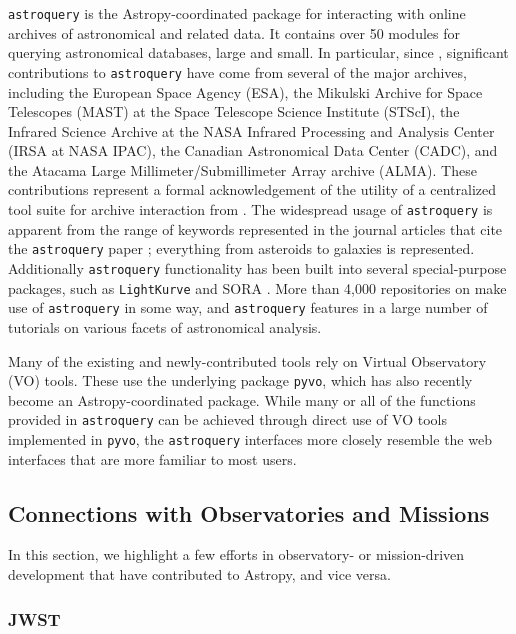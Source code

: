 \documentclass[modern]{aastex631}
\newcommand{\secauthor}[1]{{\color{blue}Author:~\textit{#1}}}
\begin{document}
\texttt{astroquery} \citep{Ginsburg2019} is the Astropy-coordinated package for
interacting with online archives of astronomical and related data. It contains
over 50 modules for querying astronomical databases, large and small. In
particular, since \paperii, significant contributions to \texttt{astroquery}
have come from several of the major archives, including the European Space
Agency (ESA), the Mikulski Archive for Space Telescopes (MAST) at the Space
Telescope Science Institute (STScI), the Infrared Science Archive at the NASA
Infrared Processing and Analysis Center (IRSA at NASA IPAC), the Canadian
Astronomical Data Center (CADC), and the Atacama Large Millimeter/Submillimeter
Array archive (ALMA). These contributions represent a formal acknowledgement of
the utility of a centralized tool suite for archive interaction from \python.
The widespread usage of \texttt{astroquery} is apparent from the range of
keywords represented in the journal articles that cite the \texttt{astroquery}
paper \citep{Ginsburg2019}; everything from asteroids to galaxies is
represented. Additionally \texttt{astroquery} functionality has been built into
several special-purpose \python packages, such as \texttt{LightKurve}
\citep{LightKurve} and SORA \citep{SORA}. More than 4,000 repositories on
\github make use of \texttt{astroquery} in some way, and \texttt{astroquery}
features in a large number of tutorials on various facets of astronomical
analysis.

Many of the existing and newly-contributed tools rely on Virtual Observatory
(VO) tools. These use the underlying package \texttt{pyvo}, which has also
recently become an Astropy-coordinated package. While many or all of the
functions provided in \texttt{astroquery} can be achieved through direct use of
VO tools implemented in \texttt{pyvo}, the \texttt{astroquery} interfaces more
closely resemble the web interfaces that are more familiar to most users.

\subsection{Connections with Observatories and Missions}

In this section, we highlight a few efforts in observatory- or mission-driven
development that have contributed to Astropy, and vice versa.

\subsubsection{JWST}
\end{document}
